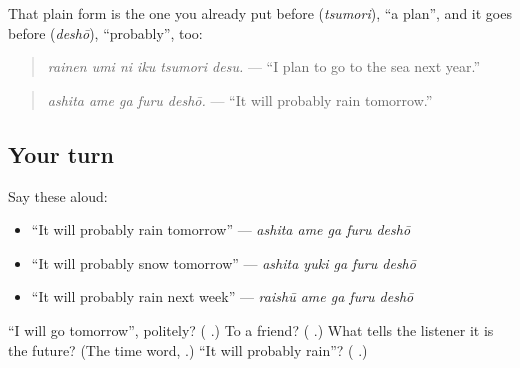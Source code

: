 That plain form is the one you already put before \textbf{} (\emph{tsumori}), \textquotedblleft{}a plan\textquotedblright{}, and it goes before \textbf{} (\emph{deshō}), \textquotedblleft{}probably\textquotedblright{}, too:

\begin{quote}
\textbf{   }
\end{quote}

\begin{quote}
\emph{rainen umi ni iku tsumori desu.} — \textquotedblleft{}I plan to go to the sea next year.\textquotedblright{}
\end{quote}

\begin{quote}
\textbf{  }
\end{quote}

\begin{quote}
\emph{ashita ame ga furu deshō.} — \textquotedblleft{}It will probably rain tomorrow.\textquotedblright{}
\end{quote}

\subsection*{Your turn}
Say these aloud:

\begin{itemize}
\raggedright
  \item \textquotedblleft{}It will probably rain tomorrow\textquotedblright{} — \emph{ashita ame ga furu deshō}
  \item \textquotedblleft{}It will probably snow tomorrow\textquotedblright{} — \emph{ashita yuki ga furu deshō}
  \item \textquotedblleft{}It will probably rain next week\textquotedblright{} — \emph{raishū ame ga furu deshō}
\end{itemize}

\begin{tcolorbox}[breakable,colback=teal!4,colframe=teal!35!black,title={Before you move on}]
\textquotedblleft{}I will go tomorrow\textquotedblright{}, politely? (\textbf{ }.) To a friend? (\textbf{ }.) What tells the listener it is the future? (The time word, \textbf{}.) \textquotedblleft{}It will probably rain\textquotedblright{}? (\textbf{ }.)
\end{tcolorbox}

